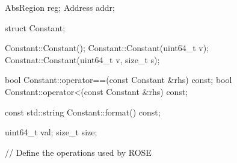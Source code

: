 \begin{apient}
AbsRegion reg;
Address addr;
\end{apient}

\begin{apient}
struct Constant;
\end{apient}

\begin{apient}
Constant::Constant();
Constant::Constant(uint64_t v);
Constnat::Constant(uint64_t v, size_t s);
\end{apient}

\begin{apient}
bool Constant::operator==(const Constant &rhs) const;
bool Constant::operator<(const Constant &rhs) const;
\end{apient}

\begin{apient}
const std::string Constant::format() const;
\end{apient}

\begin{apient}
uint64\_t val;
size\_t size;
\end{apient}

// Define the operations used by ROSE

